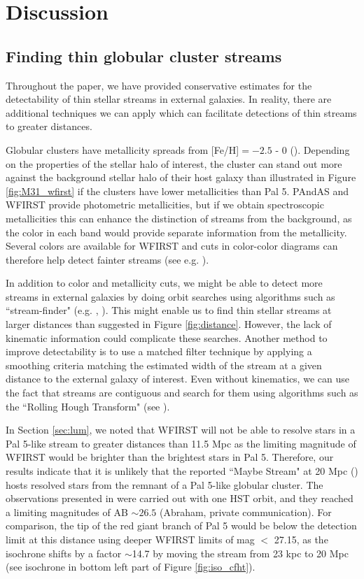 \documentclass[twocolumn]{aastex62}
\begin{document}
\section{Discussion}
\label{sec:discussion}

\subsection{Finding thin globular cluster streams}
\label{sec:color}
Throughout the paper, we have provided conservative estimates for the detectability of thin stellar streams in external galaxies. In reality, there are additional techniques we can apply which can facilitate detections of thin streams to greater distances. 

Globular clusters have metallicity spreads from [Fe/H]$ = -2.5$ - 0 (\citealt{harris96}). Depending on the properties of the stellar halo of interest, the cluster can stand out more against the background stellar halo of their host galaxy than illustrated in Figure \ref{fig:M31_wfirst} if the clusters have lower metallicities than Pal 5. PAndAS and WFIRST provide photometric metallicities, but if we obtain spectroscopic metallicities this can enhance the distinction of streams from the background, as the color in each band would provide separate information from the metallicity. Several colors are available for WFIRST and cuts in color-color diagrams can therefore help detect fainter streams (see e.g. \citealt{shipp18}). 

In addition to color and metallicity cuts, we might be able to detect more streams in external galaxies by doing orbit searches using algorithms such as ``stream-finder" (e.g. \citealt{malhan18}, \citealt{ibata19}). This might enable us to find thin stellar streams at larger distances than suggested in Figure \ref{fig:distance}. However, the lack of kinematic information could complicate these searches. Another method to improve detectability is to use a matched filter technique by applying a smoothing criteria matching the estimated width of the stream at a given distance to the external galaxy of interest. Even without kinematics, we can use the fact that streams are contiguous and search for them using algorithms such as the ``Rolling Hough Transform" (see \citealt{clark14}). 

In Section \ref{sec:lum}, we noted that WFIRST will not be able to resolve stars in a Pal 5-like stream to greater distances than 11.5 Mpc as the limiting magnitude of WFIRST would be brighter than the brightest stars in Pal 5. Therefore, our results indicate that it is unlikely that the reported ``Maybe Stream" at 20 Mpc (\citealt{abraham18}) hosts resolved stars from the remnant of a Pal 5-like globular cluster. The observations presented in \citet{abraham18}  were carried out with one HST orbit, and they reached a limiting magnitudes of AB $\sim 26.5$ (Abraham, private communication). For comparison, the tip of the red giant branch of Pal 5 would be  below the detection limit at this distance using deeper WFIRST limits of mag $<$ 27.15, as the isochrone shifts by a factor $\sim$14.7 by moving the stream from 23 kpc to 20 Mpc (see isochrone in bottom left part of Figure \ref{fig:iso_cfht}). 
\end{document}

